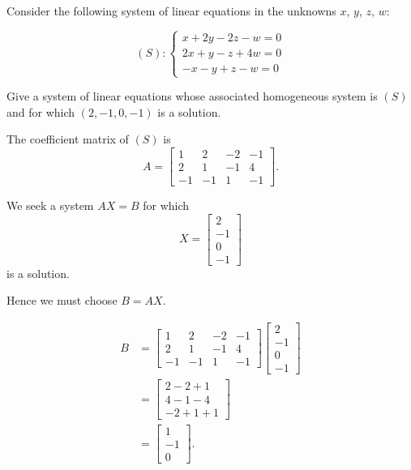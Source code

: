 \item Consider the following system of linear equations in the unknowns
$x$, $y$, $z$, $w$:

$$
(S):
\begin{cases}
x+2y-2z-w=0\\
2x+y-z+4w=0\\
-x-y+z-w=0
\end{cases}
$$

Give a system of linear equations whose associated homogeneous system
is $(S)$ and for which $(2,-1,0,-1)$ is a solution.

\begin{answer}
    The coefficient matrix of $(S)$ is
    $$
    A=
    \begin{bmatrix}
    1&2&-2&-1\\
    2&1&-1&4\\
    -1&-1&1&-1
    \end{bmatrix}.
    $$

    We seek a system $AX=B$ for which
    $$
    X=
    \begin{bmatrix}
    2\\-1\\0\\-1
    \end{bmatrix}
    $$
    is a solution.

    Hence we must choose $B=AX$.

    $$
    \begin{aligned}
    B
    &=
    \begin{bmatrix}
    1&2&-2&-1\\
    2&1&-1&4\\
    -1&-1&1&-1
    \end{bmatrix}
    \begin{bmatrix}
    2\\-1\\0\\-1
    \end{bmatrix}\\[6pt]
    &=
    \begin{bmatrix}
    2-2+1\\
    4-1-4\\
    -2+1+1
    \end{bmatrix}\\[6pt]
    &=
    \begin{bmatrix}
    1\\-1\\0
    \end{bmatrix}.
    \end{aligned}
    $$


\end{answer}
